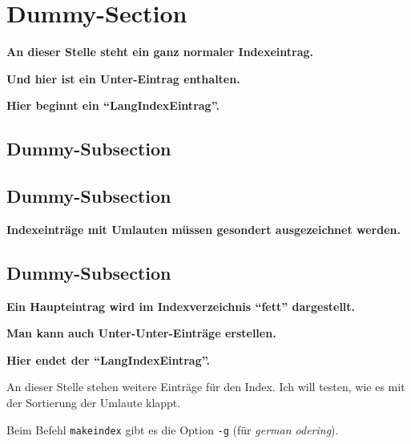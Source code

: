 \section{Dummy-Section}

\lipsum[1][1-5]

\textbf{An dieser Stelle steht ein ganz normaler Indexeintrag.}

\lipsum[1][6-10]

\textbf{Und hier ist ein Unter-Eintrag enthalten.}

\lipsum[1][11-15]

\textbf{Hier beginnt ein "`LangIndexEintrag"'.}


\subsection{Dummy-Subsection}

\lipsum[2][1-3]  

\subsection{Dummy-Subsection}

\lipsum[3][1-5]

\textbf{Indexeinträge mit Umlauten müssen gesondert ausgezeichnet werden.}

\lipsum[3][6-10]

\subsection{Dummy-Subsection}

\lipsum[4][1-3]

\textbf{Ein Haupteintrag wird im Indexverzeichnis "`fett"' dargestellt.}

\lipsum[4][4-5]

\textbf{Man kann auch Unter-Unter-Einträge erstellen.}

\lipsum[5][1-3]

\textbf{Hier endet der "`LangIndexEintrag"'.}


An dieser Stelle stehen weitere Einträge für den Index. Ich will testen, wie es mit der Sortierung der Umlaute klappt.






Beim Befehl \texttt{makeindex} gibt es die Option \texttt{-g} (für \textit{german odering}).